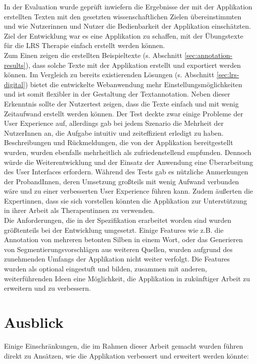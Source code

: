 In der Evaluation wurde geprüft inwiefern die Ergebnisse der mit der Applikation erstellten Texten mit den gesetzten wissenschaftlichen Zielen übereinstimmten und wie Nutzerinnen und Nutzer die Bedienbarkeit der Applikation einschätzten. Ziel der Entwicklung war es eine Applikation zu schaffen, mit der Übungstexte für die LRS Therapie einfach erstellt werden können.\\
Zum Einen zeigen die erstellten Beispieltexte (s. Abschnitt \ref{sec:annotation-results}), dass solche Texte mit der Applikation erstellt und exportiert werden können. Im Vergleich zu bereits existierenden Lösungen (s. Abschnitt \ref{sec:lrs-digital}) bietet die entwickelte Webanwendung mehr Einstellungsmöglichkeiten und ist somit flexibler in der Gestaltung der Textannotation. Neben dieser Erkenntnis sollte der Nutzertest zeigen, dass die Texte einfach und mit wenig Zeitaufwand erstellt werden können. Der Test deckte zwar einige Probleme der User Experience auf, allerdings gab bei jedem Szenario die Mehrheit der NutzerInnen an, die Aufgabe intuitiv und zeiteffizient erledigt zu haben. Beschreibungen und Rückmeldungen, die von der Applikation bereitgestellt wurden, wurden ebenfalls mehrheitlich als zufriedenstellend empfunden. Dennoch würde die Weiterentwicklung und der Einsatz der Anwendung eine Überarbeitung des User Interfaces erfordern. Während des Tests gab es nützliche Anmerkungen der ProbandInnen, deren Umsetzung großteils mit wenig Aufwand verbunden wäre und zu einer verbesserten User Experience führen kann. Zudem äußerten die Expertinnen, dass sie sich vorstellen könnten die Applikation zur Unterstützung in ihrer Arbeit als Therapeutinnen zu verwenden.\\
Die Anforderungen, die in der Spezifikation erarbeitet worden sind wurden größtenteils bei der Entwicklung umgesetzt. Einige Features wie z.B. die Annotation von mehreren betonten Silben in einem Wort, oder das Generieren von Segmentierungsvorschlägen aus weiteren Quellen, wurden aufgrund des zunehmenden Umfangs der Applikation nicht weiter verfolgt. Die Features wurden als optional eingestuft und bilden, zusammen mit anderen, weiterführenden Ideen eine Möglichkeit, die Applikation in zukünftiger Arbeit zu erweitern und zu verbessern.

\section{Ausblick}

Einige Einschränkungen, die im Rahmen dieser Arbeit gemacht wurden führen direkt zu Ansätzen, wie die Applikation verbessert und erweitert werden könnte:

